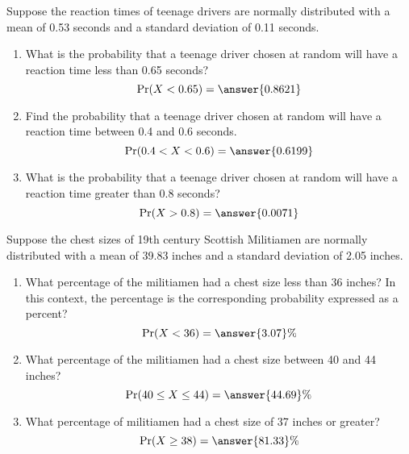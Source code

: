 \documentclass{ximera}
\begin{document}
\begin{problem}
    Suppose the reaction times of teenage drivers are normally distributed with a mean of 0.53 seconds and a standard deviation of 0.11 seconds.

  
    \begin{enumerate}
        \item What is the probability that a teenage driver chosen at random will have a reaction time less than 0.65 seconds?
        $$\Pr(X<0.65)=\answer{0.8621} $$
        \item Find the probability that a teenage driver chosen at random will have a reaction time between 0.4 and 0.6 seconds.
        $$\Pr(0.4<X<0.6)=\answer{0.6199} $$
        \item What is the probability that a teenage driver chosen at random will have a reaction time greater than 0.8 seconds?
        $$\Pr(X>0.8)=\answer{0.0071} $$
    \end{enumerate}
\end{problem}
\begin{problem}
Suppose the chest sizes of 19th century Scottish Militiamen are normally distributed with a mean of 39.83 inches and a standard deviation of 2.05 inches.    
    \begin{enumerate}
        \item What percentage of the militiamen had a chest size less than 36 inches? In this context, the percentage is the corresponding probability expressed as a percent?
        $$\Pr(X<36)=\answer{3.07}\% $$
        \item What percentage of the militiamen had a chest size between 40 and 44 inches?
        $$\Pr(40\leq X\leq 44)=\answer{44.69}\% $$
        \item What percentage of militiamen had a chest size of 37 inches or greater?
        $$\Pr(X\geq 38)=\answer{81.33}\% $$
\end{enumerate}

\end{problem}
\end{document}
